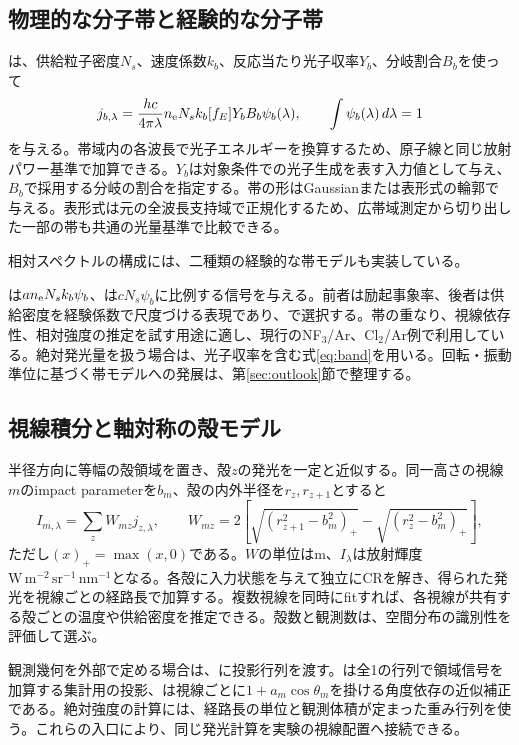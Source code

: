 \subsection{物理的な分子帯と経験的な分子帯}
は、供給粒子密度$N_s$、速度係数$k_b$、反応当たり光子収率$Y_b$、分岐割合$B_b$を使って
\begin{equation}
j_{b,\lambda}=\frac{hc}{4\pi\lambda}n_{\mathrm e} N_s k_b[f_E]Y_bB_b\psi_b(\lambda),
\qquad \int\psi_b(\lambda)\,d\lambda=1
\label{eq:band}
\end{equation}
を与える。帯域内の各波長で光子エネルギーを換算するため、原子線と同じ放射パワー基準で加算できる。$Y_b$は対象条件での光子生成を表す入力値として与え、$B_b$で採用する分岐の割合を指定する。帯の形はGaussianまたは表形式の輪郭で与える。表形式は元の全波長支持域で正規化するため、広帯域測定から切り出した一部の帯も共通の光量基準で比較できる。

相対スペクトルの構成には、二種類の経験的な帯モデルも実装している。

は$an_{\mathrm e} N_sk_b\psi_b$、は$cN_s\psi_b$に比例する信号を与える。前者は励起事象率、後者は供給密度を経験係数で尺度づける表現であり、で選択する。帯の重なり、視線依存性、相対強度の推定を試す用途に適し、現行のNF$_3$/Ar、Cl$_2$/Ar例で利用している。絶対発光量を扱う場合は、光子収率を含む式\eqref{eq:band}を用いる。回転・振動準位に基づく帯モデルへの発展は、第\ref{sec:outlook}節で整理する。

\subsection{視線積分と軸対称の殻モデル}
半径方向に等幅の殻領域を置き、殻$z$の発光を一定と近似する。同一高さの視線$m$のimpact parameterを$b_m$、殻の内外半径を$r_z,r_{z+1}$とすると
\begin{equation}
I_{m,\lambda}=\sum_zW_{mz}j_{z,\lambda},\qquad
W_{mz}=2\left[\sqrt{(r_{z+1}^2-b_m^2)_+}-\sqrt{(r_z^2-b_m^2)_+}\right],
\label{eq:chord}
\end{equation}
ただし$(x)_+=\max(x,0)$である。$W$の単位はm、$I_\lambda$は放射輝度$\mathrm{W\,m^{-2}\,sr^{-1}\,nm^{-1}}$となる。各殻に入力状態を与えて独立にCRを解き、得られた発光を視線ごとの経路長で加算する。複数視線を同時にfitすれば、各視線が共有する殻ごとの温度や供給密度を推定できる。殻数と観測数は、空間分布の識別性を評価して選ぶ。

観測幾何を外部で定める場合は、に投影行列を渡す。は全1の行列で領域信号を加算する集計用の投影、は視線ごとに$1+a_m\cos\theta_m$を掛ける角度依存の近似補正である。絶対強度の計算には、経路長の単位と観測体積が定まった重み行列を使う。これらの入口により、同じ発光計算を実験の視線配置へ接続できる。

